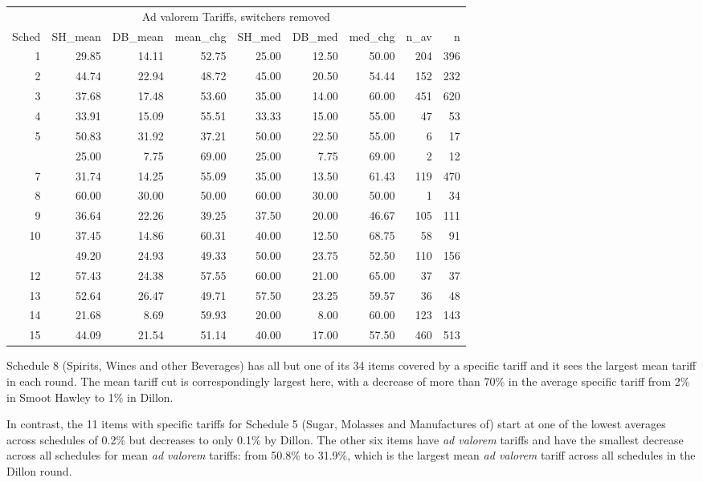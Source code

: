 \documentclass[
  12pt,
]{article}
\begin{document}
\begin{table}[!h]
\centering
\begin{tabular}[t]{rrrrrrrrr}
\toprule
\multicolumn{9}{c}{\bgroup\fontsize{12}{14}\selectfont Ad valorem Tariffs, switchers removed\egroup{}} \\
\cmidrule(l{3pt}r{3pt}){1-9}
Sched & SH\_mean & DB\_mean & mean\_chg & SH\_med & DB\_med & med\_chg & n\_av & n\\
\midrule
1 & 29.85 & 14.11 & 52.75 & 25.00 & 12.50 & 50.00 & 204 & 396\\
2 & 44.74 & 22.94 & 48.72 & 45.00 & 20.50 & 54.44 & 152 & 232\\
3 & 37.68 & 17.48 & 53.60 & 35.00 & 14.00 & 60.00 & 451 & 620\\
4 & 33.91 & 15.09 & 55.51 & 33.33 & 15.00 & 55.00 & 47 & 53\\
5 & 50.83 & 31.92 & 37.21 & 50.00 & 22.50 & 55.00 & 6 & 17\\
\addlinespace
6 & 25.00 & 7.75 & 69.00 & 25.00 & 7.75 & 69.00 & 2 & 12\\
7 & 31.74 & 14.25 & 55.09 & 35.00 & 13.50 & 61.43 & 119 & 470\\
8 & 60.00 & 30.00 & 50.00 & 60.00 & 30.00 & 50.00 & 1 & 34\\
9 & 36.64 & 22.26 & 39.25 & 37.50 & 20.00 & 46.67 & 105 & 111\\
10 & 37.45 & 14.86 & 60.31 & 40.00 & 12.50 & 68.75 & 58 & 91\\
\addlinespace
11 & 49.20 & 24.93 & 49.33 & 50.00 & 23.75 & 52.50 & 110 & 156\\
12 & 57.43 & 24.38 & 57.55 & 60.00 & 21.00 & 65.00 & 37 & 37\\
13 & 52.64 & 26.47 & 49.71 & 57.50 & 23.25 & 59.57 & 36 & 48\\
14 & 21.68 & 8.69 & 59.93 & 20.00 & 8.00 & 60.00 & 123 & 143\\
15 & 44.09 & 21.54 & 51.14 & 40.00 & 17.00 & 57.50 & 460 & 513\\
\bottomrule
\end{tabular}
\end{table}

Schedule 8 (Spirits, Wines and other Beverages) has all but one of its 34 items covered by a specific tariff and it sees the largest mean tariff in each round. The mean tariff cut is correspondingly largest here, with a decrease of more than 70\% in the average specific tariff from 2\% in Smoot Hawley to 1\% in Dillon.

In contrast, the 11 items with specific tariffs for Schedule 5 (Sugar, Molasses and Manufactures of) start at one of the lowest averages across schedules of 0.2\% but decreases to only 0.1\% by Dillon. The other six items have \emph{ad valorem} tariffs and have the smallest decrease across all schedules for mean \emph{ad valorem} tariffs: from 50.8\% to 31.9\%, which is the largest mean \emph{ad valorem} tariff across all schedules in the Dillon round.
\end{document}
